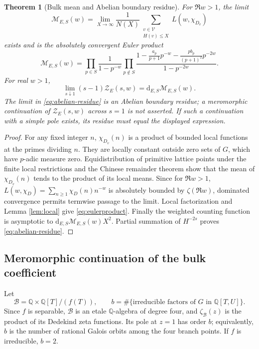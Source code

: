 \documentclass[11pt]{article}
\newtheorem{theorem}{Theorem}[section]
\newcommand{\Q}{\mathbb{Q}}
\newcommand{\calV}{\mathcal{V}}
\newcommand{\calB}{\mathcal{B}}
\begin{document}
\begin{theorem}[Bulk mean and Abelian boundary residue]\label{thm:bulk}
For $\Re w>1$, the limit
\begin{equation}\label{eq:bulkmean}
 \mathcal M_{E,S}(w)=\lim_{X\to\infty}
 \frac{1}{N(X)}\sum_{\substack{v\in\calV\\H(v)\le X}}
 L(w,\chi_{D_v})
\end{equation}
exists and is the absolutely convergent Euler product
\begin{equation}\label{eq:eulerproduct}
 \boxed{\displaystyle
 \mathcal M_{E,S}(w)=
 \prod_{p\in S}\frac1{1-p^{-w}}
 \prod_{p\notin S}
 \frac{1-\frac{a_p}{p+1}p^{-w}
       -\frac{p b_p}{(p+1)^2}p^{-2w}}
      {1-p^{-2w}}.}
\end{equation}
For real $w>1$,
\begin{equation}\label{eq:abelian-residue}
 \lim_{s\downarrow1}(s-1)\mathcal Z_E(s,w)
 =\mathrm d_{E,S}\mathcal M_{E,S}(w).
\end{equation}
The limit in \eqref{eq:abelian-residue} is an Abelian boundary residue; a meromorphic continuation of $\mathcal Z_E(s,w)$ across $s=1$ is not asserted.  If such a continuation with a simple pole exists, its residue must equal the displayed expression.
\end{theorem}
\begin{proof}
For any fixed integer $n$, $\chi_{D_v}(n)$ is a product of bounded local functions at the primes dividing $n$.  They are locally constant outside zero sets of $G$, which have $p$-adic measure zero.  Equidistribution of primitive lattice points under the finite local restrictions and the Chinese remainder theorem show that the mean of $\chi_{D_v}(n)$ tends to the product of its local means.  Since for $\Re w>1$,
$L(w,\chi_D)=\sum_{n\ge1}\chi_D(n)n^{-w}$ is absolutely bounded by $\zeta(\Re w)$, dominated convergence permits termwise passage to the limit.  Local factorization and Lemma \ref{lem:local} give \eqref{eq:eulerproduct}.  Finally the weighted counting function is asymptotic to
$\mathrm d_{E,S}\mathcal M_{E,S}(w)X^2$.  Partial summation of $H^{-2s}$ proves \eqref{eq:abelian-residue}.
\end{proof}

\subsection{Meromorphic continuation of the bulk coefficient}
Let
\begin{equation}\label{eq:branchalgebra}
 \calB=\Q\times\Q[T]/(f(T)),\qquad
 b=\#\{\text{irreducible factors of }G\text{ in }\Q[T,U]\}.
\end{equation}
Since $f$ is separable, $\calB$ is an etale $\Q$-algebra of degree four, and $\zeta_{\calB}(z)$ is the product of its Dedekind zeta functions.  Its pole at $z=1$ has order $b$; equivalently, $b$ is the number of rational Galois orbits among the four branch points.  If $f$ is irreducible, $b=2$.
\end{document}

